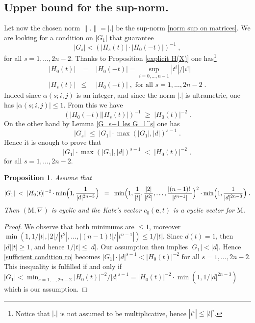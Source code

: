 \documentclass{compositio}
\newtheorem{proposition}[theorem]{Proposition}
\numberwithin{equation}{section}
\begin{document}
\subsection{Upper bound for the sup-norm.} 
Let now the chosen norm $\|.\|=|.|$ be the sup-norm 
\eqref{norm sup on matrices}. We are looking for a condition on $|G_1|$ that guarantee 
\begin{equation}\label{condition -t-}
|G_s|<(|H_s(t)|\cdot|H_0(-t)|)^{-1}\;,
\end{equation}
for all $s=1,\ldots,2n-2$. Thanks to Proposition \ref{explicit H(X)} one 
has\footnote{Notice that $|.|$ is not assumed 
to be multiplicative, hence $|t^i|\leq|t|^i$.}
\begin{eqnarray}
|H_0(t)|&\;=\;&|H_0(-t)|=\sup_{i=0,\ldots,n-1}|t^i|/|i!|\\
|H_s(t)|&\leq&|H_0(-t)|\;,\textrm{ for all }s=1,\ldots,2n-2\;.
\end{eqnarray}
Indeed since $\alpha(s;i,j)$ is an integer, and since the norm $|.|$ is ultrametric, one has $|\alpha(s;i,j)|\leq 1$. 
From this we have 
\begin{equation}
(|H_0(-t)||H_s(t)|)^{-1}\;\geq\;|H_0(t)|^{-2}\;.
\end{equation} 
On the other hand by Lemma \ref{G_s+1 les G_1^s} one has
\begin{equation}
|G_s|\;\leq\;|G_1|\cdot\max(|G_1|,|d|)^{s-1}\;.
\end{equation}
Hence it is enough to prove that
\begin{equation}\label{sufficient condition ro}
|G_1|\cdot\max(|G_1|,|d|)^{s-1} \; < \;|H_0(t)|^{-2}\;,
\end{equation}
for all $s=1,\ldots,2n-2$. 
\begin{proposition}
Assume that
\begin{equation}
|G_1|\;<\;|H_0(t)|^{-2}\cdot 
\min\Bigl(1,\frac{1}{|d|^{2n-3}}\Bigr)\;\;=\;\;
\min\Bigl(1,\frac{1}{|t|},\frac{|2|}{|t^2|},\ldots,\frac{|(n-1)!|}{|t^{n-1}|}\Bigr)^2\cdot
\min\Bigl(1,\frac{1}{|d|^{2n-3}}\Bigr)\;.
\end{equation}
Then $({\mathrm{M}},\nabla)$ is cyclic and the Katz's vector $c_0({\mathbf{e}},t)$ is a cyclic vector for ${\mathrm{M}}$.
\end{proposition}
\begin{proof}
We observe that both minimums are $\leq 1$, moreover 
$\min(1,1/|t|,|2|/|t^2|,\ldots,|(n-1)!|/|t^{n-1}|)\leq1/|t|$. 
Since $d(t)=1$, then $|d||t|\geq 1$, and hence 
$1/|t|\leq|d|$. Our assumption then implies $|G_1|<|d|$. Hence 
\eqref{sufficient condition ro} becomes $|G_1|\cdot|d|^{s-1}<|H_0(t)|^{-2}$ for all 
$s=1,\ldots,2n-2$. This inequality is fulfilled if and only if 
$|G_1|< \min_{s=1,\ldots,2n-2}|H_0(t)|^{-2}/|d|^{s-1}= 
|H_0(t)|^{-2}\cdot\min(1,1/|d|^{2n-3})$ which 
is our assumption.
\end{proof}
\end{document}
